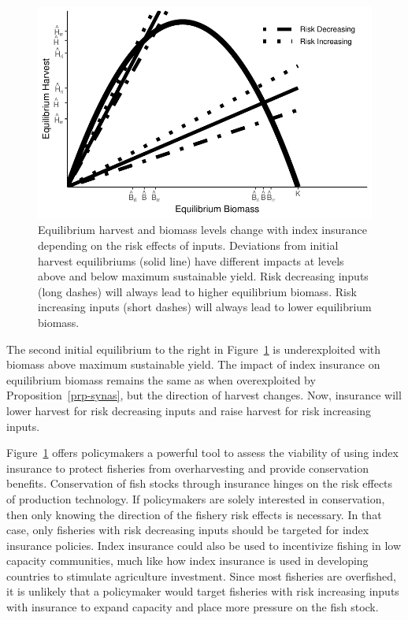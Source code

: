 \documentclass[
  letterpaper,
  DIV=11,
  numbers=noendperiod]{scrartcl}
\theoremstyle{plain}
\theoremstyle{plain}
\theoremstyle{remark}
\begin{document}
\begin{figure}

{\centering \includegraphics{ibi-behavior_files/figure-pdf/fig-synas-1.pdf}

}

\caption{\label{fig-synas}Equilibrium harvest and biomass levels change
with index insurance depending on the risk effects of inputs. Deviations
from initial harvest equilibriums (solid line) have different impacts at
levels above and below maximum sustainable yield. Risk decreasing inputs
(long dashes) will always lead to higher equilibrium biomass. Risk
increasing inputs (short dashes) will always lead to lower equilibrium
biomass.}

\end{figure}

The second initial equilibrium to the right in Figure~\ref{fig-synas} is
underexploited with biomass above maximum sustainable yield. The impact
of index insurance on equilibrium biomass remains the same as when
overexploited by Proposition~\ref{prp-synas}, but the direction of
harvest changes. Now, insurance will lower harvest for risk decreasing
inputs and raise harvest for risk increasing inputs.

Figure~\ref{fig-synas} offers policymakers a powerful tool to assess the
viability of using index insurance to protect fisheries from
overharvesting and provide conservation benefits. Conservation of fish
stocks through insurance hinges on the risk effects of production
technology. If policymakers are solely interested in conservation, then
only knowing the direction of the fishery risk effects is necessary. In
that case, only fisheries with risk decreasing inputs should be targeted
for index insurance policies. Index insurance could also be used to
incentivize fishing in low capacity communities, much like how index
insurance is used in developing countries to stimulate agriculture
investment. Since most fisheries are overfished, it is unlikely that a
policymaker would target fisheries with risk increasing inputs with
insurance to expand capacity and place more pressure on the fish stock.
\end{document}
